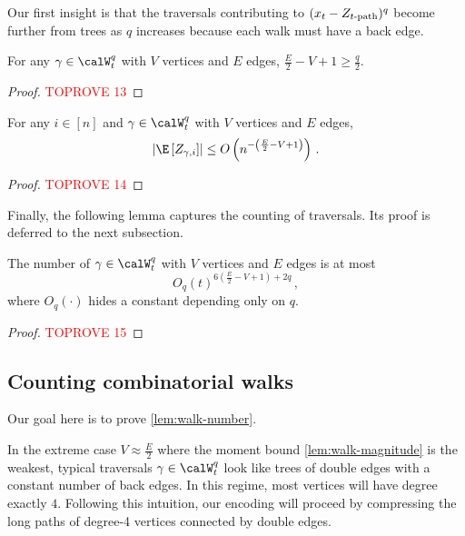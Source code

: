 \documentclass[12pt]{article}
\begin{document}
Our first insight is that the traversals contributing to $(x_t-Z_{t\textnormal{-path}})^q$ become further from trees as $q$ increases because each walk must have a back edge.

\begin{lemma}
    For any $\gamma\in \calW_t^q$ with $V$ vertices and $E$ edges, $\frac E 2 - V + 1\ge \frac q 2$.
\end{lemma}

\begin{proof}\textcolor{red}{TOPROVE 13}\end{proof}

\begin{lemma}\label{lem:walk-magnitude}
    For any $i\in[n]$ and $\gamma\in\calW_t^q$ with $V$ vertices and $E$ edges,
    \[
        \left|\E\left[Z_{\gamma,i}\right]\right|\le O\left(n^{-\left(\frac E 2 - V + 1\right)}\right)\,.
    \]
\end{lemma}

\begin{proof}\textcolor{red}{TOPROVE 14}\end{proof}

Finally, the following lemma captures the counting of traversals. Its proof is deferred to the next subsection.

\begin{lemma}\label{lem:walk-number}
    The number of $\gamma\in\calW_t^q$ with $V$ vertices and $E$ edges is at most
    \[
        O_q(t)^{6\left(\frac{E}{2} - V+1\right)+2q}\,,
    \]
    where $O_q(\cdot)$ hides a constant depending only on $q$.
\end{lemma}

\begin{proof}\textcolor{red}{TOPROVE 15}\end{proof}

\subsection{Counting combinatorial walks}

Our goal here is to prove \cref{lem:walk-number}. 

In the extreme case $V\approx \frac {E} 2$ where the moment bound \cref{lem:walk-magnitude} is the weakest, typical traversals $\gamma\in\calW^q_t$ look like trees of double edges with a constant number of back edges. In this regime, most vertices will have degree exactly $4$. Following this intuition, our encoding will proceed by compressing the long paths of degree-4 vertices connected by double edges.
\end{document}
